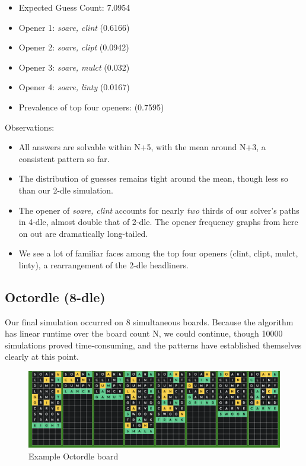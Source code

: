 \documentclass[11pt, oneside]{article} 	%
\begin{document}
\begin{itemize}
\item Expected Guess Count: 7.0954
\item Opener 1: \emph{soare, clint} (0.6166)
\item Opener 2: \emph{soare, clipt} (0.0942)
\item Opener 3: \emph{soare, mulct} (0.032)
\item Opener 4: \emph{soare, linty} (0.0167)
\item Prevalence of top four openers: (0.7595)
\end{itemize}

Observations: 
\begin{itemize}
\item All answers are solvable within N+5, with the mean around N+3, a consistent pattern so far.
\item The distribution of guesses remains tight around the mean, though less so than our 2-dle simulation.
\item The opener of \emph{soare, clint} accounts for nearly \emph{two} thirds of our solver's paths in 4-dle, almost double that of 2-dle.  The opener frequency graphs from here on out are dramatically long-tailed.
\item We see a lot of familiar faces among the top four openers (clint, clipt, mulct, linty), a rearrangement of the 2-dle headliners.
\end{itemize}


\subsection{Octordle (8-dle)}

Our final simulation occurred on 8 simultaneous boards. Because the algorithm has linear runtime over the board count N, we could continue, though 10000 simulations proved time-consuming, and the patterns have established themselves clearly at this point. 

\begin{figure}[!htb]
\includegraphics[scale=.33]{octordle}
\caption{Example Octordle board}%
\end{figure}
\end{document}
